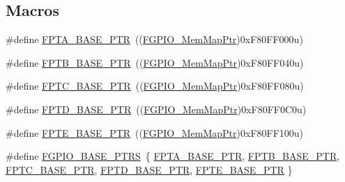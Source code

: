 \subsection*{Macros}
\begin{DoxyCompactItemize}
\item 
\#define \hyperlink{group___f_g_p_i_o___peripheral_ga4b0d89f517528ab7c1d2fdefe4c863d8}{F\+P\+T\+A\+\_\+\+B\+A\+S\+E\+\_\+\+P\+TR}~((\hyperlink{group___f_g_p_i_o___peripheral_gaeed3beeb5e5c99ae5b0e404b21466e55}{F\+G\+P\+I\+O\+\_\+\+Mem\+Map\+Ptr})0x\+F80\+F\+F000u)
\item 
\#define \hyperlink{group___f_g_p_i_o___peripheral_ga725ec21a43213bffe0aa484f7406bcf5}{F\+P\+T\+B\+\_\+\+B\+A\+S\+E\+\_\+\+P\+TR}~((\hyperlink{group___f_g_p_i_o___peripheral_gaeed3beeb5e5c99ae5b0e404b21466e55}{F\+G\+P\+I\+O\+\_\+\+Mem\+Map\+Ptr})0x\+F80\+F\+F040u)
\item 
\#define \hyperlink{group___f_g_p_i_o___peripheral_gaed3b8398ebed63795f9ce57eb9a59097}{F\+P\+T\+C\+\_\+\+B\+A\+S\+E\+\_\+\+P\+TR}~((\hyperlink{group___f_g_p_i_o___peripheral_gaeed3beeb5e5c99ae5b0e404b21466e55}{F\+G\+P\+I\+O\+\_\+\+Mem\+Map\+Ptr})0x\+F80\+F\+F080u)
\item 
\#define \hyperlink{group___f_g_p_i_o___peripheral_gabaff6b055edb9ba703415d0473b92ca8}{F\+P\+T\+D\+\_\+\+B\+A\+S\+E\+\_\+\+P\+TR}~((\hyperlink{group___f_g_p_i_o___peripheral_gaeed3beeb5e5c99ae5b0e404b21466e55}{F\+G\+P\+I\+O\+\_\+\+Mem\+Map\+Ptr})0x\+F80\+F\+F0\+C0u)
\item 
\#define \hyperlink{group___f_g_p_i_o___peripheral_ga191ce600c147c06111ecea5b3b0aa6fb}{F\+P\+T\+E\+\_\+\+B\+A\+S\+E\+\_\+\+P\+TR}~((\hyperlink{group___f_g_p_i_o___peripheral_gaeed3beeb5e5c99ae5b0e404b21466e55}{F\+G\+P\+I\+O\+\_\+\+Mem\+Map\+Ptr})0x\+F80\+F\+F100u)
\item 
\#define \hyperlink{group___f_g_p_i_o___peripheral_ga58956e4d0a0ffec3e1dd70e77a5160b4}{F\+G\+P\+I\+O\+\_\+\+B\+A\+S\+E\+\_\+\+P\+T\+RS}~\{ \hyperlink{group___f_g_p_i_o___peripheral_ga4b0d89f517528ab7c1d2fdefe4c863d8}{F\+P\+T\+A\+\_\+\+B\+A\+S\+E\+\_\+\+P\+TR}, \hyperlink{group___f_g_p_i_o___peripheral_ga725ec21a43213bffe0aa484f7406bcf5}{F\+P\+T\+B\+\_\+\+B\+A\+S\+E\+\_\+\+P\+TR}, \hyperlink{group___f_g_p_i_o___peripheral_gaed3b8398ebed63795f9ce57eb9a59097}{F\+P\+T\+C\+\_\+\+B\+A\+S\+E\+\_\+\+P\+TR}, \hyperlink{group___f_g_p_i_o___peripheral_gabaff6b055edb9ba703415d0473b92ca8}{F\+P\+T\+D\+\_\+\+B\+A\+S\+E\+\_\+\+P\+TR}, \hyperlink{group___f_g_p_i_o___peripheral_ga191ce600c147c06111ecea5b3b0aa6fb}{F\+P\+T\+E\+\_\+\+B\+A\+S\+E\+\_\+\+P\+TR} \}
\end{DoxyCompactItemize}
